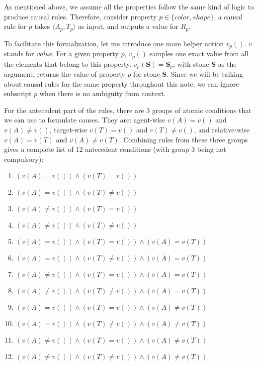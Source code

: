 \documentclass{article}
\begin{document}
As mentioned above, we assume all the properties follow the same kind of logic to produce causal rules. Therefore, consider property $p \in \{color, shape\}$, a causal rule for $p$ takes $\langle A_p, T_p \rangle$ as input, and outputs a value for $R_p$.

To facilitate this formalization, let me introduce one more helper notion $v_p()$. $v$ stands for \emph{value}. For a given property $p$, $v_p()$ samples one exact value from all the elements that belong to this property. $v_p(\mathbf{S}) = \mathbf{S}_p$, with stone $\mathbf{S}$ as the argument, returns the value of property $p$ for stone $\mathbf{S}$. Since we will be talking about causal rules for the same property throughout this note, we can ignore subscript $p$ when there is no ambiguity from context.

For the antecedent part of the rules, there are 3 groups of atomic conditions that we can use to formulate causes. They are: agent-wise $v(A) = v()$ and $v(A) \neq v()$, target-wise $v(T) = v()$ and $v(T) \neq v()$, and relative-wise $v(A) = v(T)$ and $v(A) \neq v(T)$. Combining rules from these three groups gives a complete list of $12$ antecedent conditions (with group 3 being not compulsory):

\begin{enumerate}
\item $(v(A) = v()) \wedge (v(T) = v())$
\item $(v(A) = v()) \wedge (v(T) \neq v())$
\item $(v(A) \neq v()) \wedge (v(T) = v())$
\item $(v(A) \neq v()) \wedge (v(T) \neq v())$
\item $(v(A) = v()) \wedge (v(T) = v()) \wedge (v(A) = v(T))$
\item $(v(A) = v()) \wedge (v(T) \neq v()) \wedge (v(A) = v(T))$
\item $(v(A) \neq v()) \wedge (v(T) = v()) \wedge (v(A) = v(T))$
\item $(v(A) \neq v()) \wedge (v(T) \neq v()) \wedge (v(A) = v(T))$
\item $(v(A) = v()) \wedge (v(T) = v()) \wedge (v(A) \neq v(T))$
\item $(v(A) = v()) \wedge (v(T) \neq v()) \wedge (v(A) \neq v(T))$
\item $(v(A) \neq v()) \wedge (v(T) = v()) \wedge (v(A) \neq v(T))$
\item $(v(A) \neq v()) \wedge (v(T) \neq v()) \wedge (v(A) \neq v(T))$
\end{enumerate}
\end{document}

